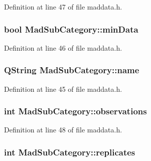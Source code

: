 Definition at line 47 of file maddata.\-h.

\hypertarget{struct_mad_sub_category_a3728af78f99ce0a8c3be3165626862db}{
\subsubsection[{min\-Data}]{\setlength{\rightskip}{0pt plus 5cm}bool Mad\-Sub\-Category\-::min\-Data}}\label{struct_mad_sub_category_a3728af78f99ce0a8c3be3165626862db}


Definition at line 46 of file maddata.\-h.

\hypertarget{struct_mad_sub_category_a0f0d32eb25cfe2236b5b68a65f3bda0a}{
\subsubsection[{name}]{\setlength{\rightskip}{0pt plus 5cm}Q\-String Mad\-Sub\-Category\-::name}}\label{struct_mad_sub_category_a0f0d32eb25cfe2236b5b68a65f3bda0a}


Definition at line 45 of file maddata.\-h.

\hypertarget{struct_mad_sub_category_a7ac12663efbd43f8bb85449c4783523d}{
\subsubsection[{observations}]{\setlength{\rightskip}{0pt plus 5cm}int Mad\-Sub\-Category\-::observations}}\label{struct_mad_sub_category_a7ac12663efbd43f8bb85449c4783523d}


Definition at line 48 of file maddata.\-h.

\hypertarget{struct_mad_sub_category_aa2238ad9a0d06d1d35c88c6c6c508270}{
\subsubsection[{replicates}]{\setlength{\rightskip}{0pt plus 5cm}int Mad\-Sub\-Category\-::replicates}}\label{struct_mad_sub_category_aa2238ad9a0d06d1d35c88c6c6c508270}


